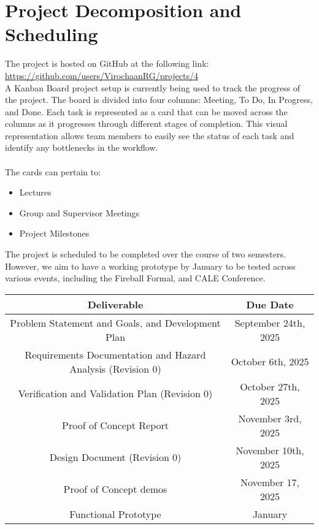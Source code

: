\documentclass{article}
\begin{document}
\section{Project Decomposition and Scheduling}



The project is hosted on GitHub at the following link: \url{https://github.com/users/VirochaanRG/projects/4}
\\
A Kanban Board project setup is currently being used to track the progress of the project. The board is divided into four columns: Meeting, To Do, In Progress, and Done. Each task is represented as a card that can be moved across the columns as it progresses through different stages of completion. This visual representation allows team members to easily see the status of each task and identify any bottlenecks in the workflow.
\\\\
The cards can pertain to:
\begin{itemize}
  \item Lectures
  \item Group and Supervisor Meetings
  \item Project Milestones
\end{itemize}

The project is scheduled to be completed over the course of two semesters. However, we aim to have a working prototype by January to be tested across various events, including the Fireball Formal, and CALE Conference.
\\
\begin{center}
  \begin{tabular}{ |c|c| }
  \hline
  Deliverable & Due Date \\
  \hline
  Problem Statement and Goals, and Development Plan & September 24th, 2025 \\ 
  Requirements Documentation and Hazard Analysis (Revision 0) & October 6th, 2025  \\  
  Verification and Validation Plan (Revision 0) & October 27th, 2025 \\
  Proof of Concept Report & November 3rd, 2025 \\
  Design Document (Revision 0) & November 10th, 2025 \\
  Proof of Concept demos & November 17, 2025 \\
  Functional Prototype & January \\
  \hline
  \end{tabular}
\end{center}
\end{document}
